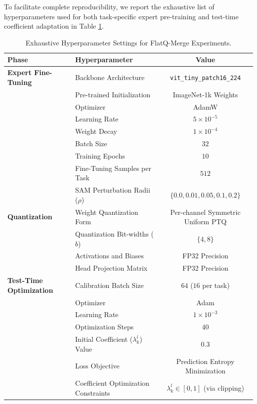 \documentclass{article}
\theoremstyle{plain}
\theoremstyle{definition}
\theoremstyle{remark}
\begin{document}
To facilitate complete reproducibility, we report the exhaustive list of hyperparameters used for both task-specific expert pre-training and test-time coefficient adaptation in Table \ref{tab:hyperparameters}.

\begin{table}[H]
\caption{Exhaustive Hyperparameter Settings for FlatQ-Merge Experiments.}
\label{tab:hyperparameters}
\vskip 0.15in
\begin{center}
\begin{small}
\begin{tabular}{llc}
\toprule
\textbf{Phase} & \textbf{Hyperparameter} & \textbf{Value} \\
\midrule
\textbf{Expert Fine-Tuning} & Backbone Architecture & \texttt{vit\_tiny\_patch16\_224} \\
& Pre-trained Initialization & ImageNet-1k Weights \\
& Optimizer & AdamW \\
& Learning Rate & $5 \times 10^{-5}$ \\
& Weight Decay & $1 \times 10^{-4}$ \\
& Batch Size & $32$ \\
& Training Epochs & $10$ \\
& Fine-Tuning Samples per Task & $512$ \\
& SAM Perturbation Radii ($\rho$) & $\{0.0, 0.01, 0.05, 0.1, 0.2\}$ \\
\midrule
\textbf{Quantization} & Weight Quantization Form & Per-channel Symmetric Uniform PTQ \\
& Quantization Bit-widths ($b$) & $\{4, 8\}$ \\
& Activations and Biases & FP32 Precision \\
& Head Projection Matrix & FP32 Precision \\
\midrule
\textbf{Test-Time Optimization} & Calibration Batch Size & $64$ ($16$ per task) \\
& Optimizer & Adam \\
& Learning Rate & $1 \times 10^{-3}$ \\
& Optimization Steps & $40$ \\
& Initial Coefficient ($\lambda^l_k$) Value & $0.3$ \\
& Loss Objective & Prediction Entropy Minimization \\
& Coefficient Optimization Constraints & $\lambda^l_k \in [0, 1]$ (via clipping) \\
\bottomrule
\end{tabular}
\end{small}
\end{center}
\vskip -0.1in
\end{table}
\end{document}

